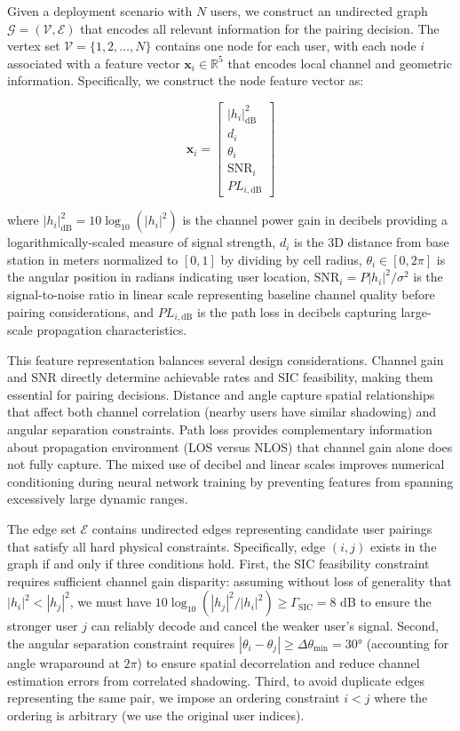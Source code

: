 Given a deployment scenario with $N$ users, we construct an undirected graph $\mathcal{G} = (\mathcal{V}, \mathcal{E})$ that encodes all relevant information for the pairing decision. The vertex set $\mathcal{V} = \{1, 2, \ldots, N\}$ contains one node for each user, with each node $i$ associated with a feature vector $\mathbf{x}_i \in \mathbb{R}^5$ that encodes local channel and geometric information. Specifically, we construct the node feature vector as:

\begin{equation}
\mathbf{x}_i = \begin{bmatrix}
|h_i|^2_{\text{dB}} \\
d_i \\
\theta_i \\
\text{SNR}_i \\
PL_{i,\text{dB}}
\end{bmatrix}
\end{equation}

where $|h_i|^2_{\text{dB}} = 10\log_{10}(|h_i|^2)$ is the channel power gain in decibels providing a logarithmically-scaled measure of signal strength, $d_i$ is the 3D distance from base station in meters normalized to $[0,1]$ by dividing by cell radius, $\theta_i \in [0, 2\pi]$ is the angular position in radians indicating user location, $\text{SNR}_i = P|h_i|^2 / \sigma^2$ is the signal-to-noise ratio in linear scale representing baseline channel quality before pairing considerations, and $PL_{i,\text{dB}}$ is the path loss in decibels capturing large-scale propagation characteristics.

This feature representation balances several design considerations. Channel gain and SNR directly determine achievable rates and SIC feasibility, making them essential for pairing decisions. Distance and angle capture spatial relationships that affect both channel correlation (nearby users have similar shadowing) and angular separation constraints. Path loss provides complementary information about propagation environment (LOS versus NLOS) that channel gain alone does not fully capture. The mixed use of decibel and linear scales improves numerical conditioning during neural network training by preventing features from spanning excessively large dynamic ranges.

The edge set $\mathcal{E}$ contains undirected edges representing candidate user pairings that satisfy all hard physical constraints. Specifically, edge $(i,j)$ exists in the graph if and only if three conditions hold. First, the SIC feasibility constraint requires sufficient channel gain disparity: assuming without loss of generality that $|h_i|^2 < |h_j|^2$, we must have $10\log_{10}(|h_j|^2 / |h_i|^2) \geq \Gamma_{\text{SIC}} = 8$ dB to ensure the stronger user $j$ can reliably decode and cancel the weaker user's signal. Second, the angular separation constraint requires $|\theta_i - \theta_j| \geq \Delta\theta_{\min} = 30°$ (accounting for angle wraparound at $2\pi$) to ensure spatial decorrelation and reduce channel estimation errors from correlated shadowing. Third, to avoid duplicate edges representing the same pair, we impose an ordering constraint $i < j$ where the ordering is arbitrary (we use the original user indices).

